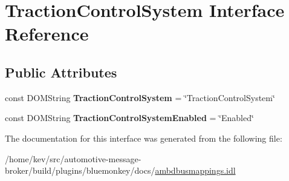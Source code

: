 \hypertarget{interfaceTractionControlSystem}{\section{Traction\+Control\+System Interface Reference}
\label{interfaceTractionControlSystem}
}
\subsection*{Public Attributes}
\begin{DoxyCompactItemize}
\item 
\hypertarget{interfaceTractionControlSystem_afa6b052fdb3c23cb965a73e93bd34400}{const D\+O\+M\+String {\bfseries Traction\+Control\+System} = \char`\"{}Traction\+Control\+System\char`\"{}}\label{interfaceTractionControlSystem_afa6b052fdb3c23cb965a73e93bd34400}

\item 
\hypertarget{interfaceTractionControlSystem_a7392cc43962b76f1b46aafc3fed5ed26}{const D\+O\+M\+String {\bfseries Traction\+Control\+System\+Enabled} = \char`\"{}Enabled\char`\"{}}\label{interfaceTractionControlSystem_a7392cc43962b76f1b46aafc3fed5ed26}

\end{DoxyCompactItemize}


The documentation for this interface was generated from the following file\+:\begin{DoxyCompactItemize}
\item 
/home/kev/src/automotive-\/message-\/broker/build/plugins/bluemonkey/docs/\hyperlink{ambdbusmappings_8idl}{ambdbusmappings.\+idl}\end{DoxyCompactItemize}
